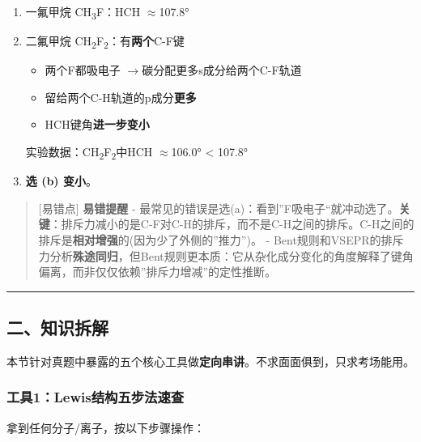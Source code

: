 \documentclass[a4paper,11pt]{ctexart}
\providecommand{\tightlist}{\setlength{\itemsep}{0pt}\setlength{\parskip}{0pt}}
\newcommand{\箭}{\ensuremath{\rightarrow}}
\newcommand{\左箭}{\ensuremath{\leftarrow}}
\newcommand{\上箭}{\ensuremath{\uparrow}}
\newcommand{\下箭}{\ensuremath{\downarrow}}
\newcommand{\衡}{\ensuremath{\rightleftharpoons}}
\newcommand{\双箭}{\ensuremath{\leftrightarrow}}
\newcommand{\约等于}{\ensuremath{\approx}}
\newcommand{\小于等于}{\ensuremath{\leq}}
\newcommand{\大于等于}{\ensuremath{\geq}}
\newcommand{\不等于}{\ensuremath{\neq}}
\newcommand{\西格马}{\ensuremath{\sigma}}
\newcommand{\派}{\ensuremath{\pi}}
\begin{document}
\begin{enumerate}
\def\labelenumi{\arabic{enumi}.}
\item
  一氟甲烷 CH\textsubscript{3}F：HCH \约等于 107.8°
\item
  二氟甲烷 CH\textsubscript{2}F\textsubscript{2}：有\textbf{两个}C-F键

  \begin{itemize}
  \tightlist
  \item
    两个F都吸电子 \箭 碳分配更多s成分给两个C-F轨道
  \item
    留给两个C-H轨道的p成分\textbf{更多}
  \item
    HCH键角\textbf{进一步变小}
  \end{itemize}

  实验数据：CH\textsubscript{2}F\textsubscript{2}中HCH \约等于 106.0° \textless{} 107.8°
\item
  \textbf{选 (b) 变小}。
\end{enumerate}

\begin{quote}
{[}易错点{]} \textbf{易错提醒}
- 最常见的错误是选(a)：看到''F吸电子``就冲动选了。\textbf{关键}：排斥力减小的是C-F对C-H的排斥，而不是C-H之间的排斥。C-H之间的排斥是\textbf{相对增强}的(因为少了外侧的''推力'')。
- Bent规则和VSEPR的排斥力分析\textbf{殊途同归}，但Bent规则更本质：它从杂化成分变化的角度解释了键角偏离，而非仅仅依赖''排斥力增减''的定性推断。
\end{quote}

\begin{center}\rule{0.5\linewidth}{0.5pt}\end{center}

\subsection{二、知识拆解}\label{ux4e8cux77e5ux8bc6ux62c6ux89e3}

本节针对真题中暴露的五个核心工具做\textbf{定向串讲}。不求面面俱到，只求考场能用。

\subsubsection{工具1：Lewis结构五步法速查}\label{ux5de5ux51771lewisux7ed3ux6784ux4e94ux6b65ux6cd5ux901fux67e5}

拿到任何分子/离子，按以下步骤操作：
\end{document}
